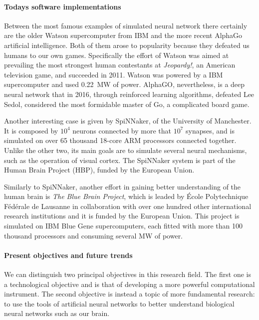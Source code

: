 \paragraph{Todays software implementations\\}
Between the most famous examples of simulated neural network there certainly are the older Watson supercomputer from IBM and the more recent AlphaGo artificial intelligence.
Both of them arose to popularity because they defeated us humans to our own games.
Specifically the effort of Watson was aimed at prevailing the most strongest human contestants at \textit{Jeopardy!}, an American television game, and succeeded in 2011.
Watson was powered by a IBM supercomputer and used \SI{0.22}{\MW} of power.
AlphaGO, nevertheless, is a deep neural network that in 2016, through reinforced learning algorithms, defeated Lee Sedol, considered the most formidable master of Go, a complicated board game.

Another interesting case is given by SpiNNaker, of the University of Manchester.
It is composed by $10^4$ neurons connected by more that $10^7$ synapses, and is simulated on over 65 thousand 18-core ARM processors connected together.
Unlike the other two, its main goals are to simulate several neural mechanisms, such as the operation of visual cortex.
The SpiNNaker system is part of the Human Brain Project (HBP), funded by the European Union.\cite{HBP.eu}

Similarly to SpiNNaker, another effort in gaining better understanding of the human brain is \textit{The Blue Brain Project}, which is leaded by École Polytechnique Fédérale de Lausanne in collaboration with over one hundred other international research institutions and it is funded by the European Union.
This project is simulated on IBM Blue Gene supercomputers, each fitted with more than 100 thousand processors and consuming several \si{\MW} of power.

\paragraph{Present objectives and future trends\\}
We can distinguish two principal objectives in this research field.
The first one is a technological objective and is that of developing a more powerful computational instrument.
The second objective is instead a topic of more fundamental research: to use the tools of artificial neural networks to better understand biological neural networks such as our brain.

